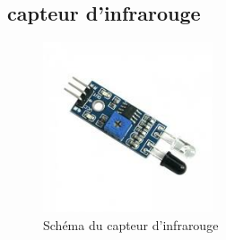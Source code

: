 \documentclass[12pt, openany]{report}
\begin{document}
    \subsection{ capteur d'infrarouge}
           \begin{figure}[!h]
                                    \centering
                   \includegraphics[height=5cm,width=5cm]{composantes/infrarouge.png} 
                             \caption{Schéma du capteur  d'infrarouge}
                                   		          		
                    \end{figure} 	
\end{document}
